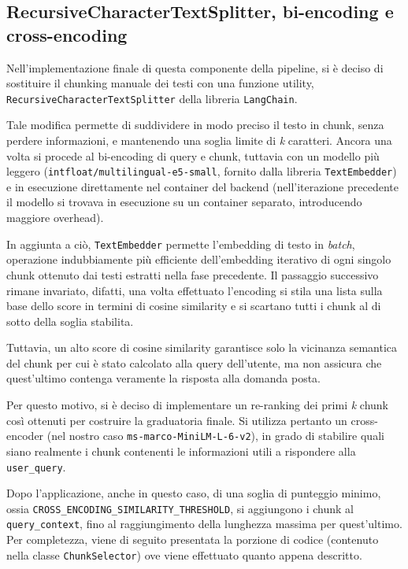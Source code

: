 \subsection{RecursiveCharacterTextSplitter, bi-encoding e cross-encoding}
Nell'implementazione finale di questa componente della pipeline, si è deciso di sostituire il chunking manuale dei testi con una funzione utility, \texttt{RecursiveCharacter\allowbreak TextSplitter} della libreria \texttt{LangChain}.

Tale modifica permette di suddividere in modo preciso il testo in chunk, senza perdere informazioni, e mantenendo una soglia limite di \textit{k} caratteri. Ancora una volta si procede al bi-encoding di query e chunk, tuttavia con un modello più leggero (\texttt{intfloat/multilingual-e5-small}, fornito dalla libreria \texttt{TextEmbedder}) e in esecuzione direttamente nel container del backend (nell'iterazione precedente il modello si trovava in esecuzione su un container separato, introducendo maggiore overhead).

In aggiunta a ciò, \texttt{TextEmbedder} permette l'embedding di testo in \textit{batch}, operazione indubbiamente più efficiente dell'embedding iterativo di ogni singolo chunk ottenuto dai testi estratti nella fase precedente. Il passaggio successivo rimane invariato, difatti, una volta effettuato l'encoding si stila una lista sulla base dello score in termini di cosine similarity e si scartano tutti i chunk al di sotto della soglia stabilita.

Tuttavia, un alto score di cosine similarity garantisce solo la vicinanza semantica del chunk per cui è stato calcolato alla query dell'utente, ma non assicura che quest'ultimo contenga veramente la risposta alla domanda posta.

Per questo motivo, si è deciso di implementare un re-ranking dei primi \textit{k} chunk così ottenuti per costruire la graduatoria finale. Si utilizza pertanto un cross-encoder (nel nostro caso \texttt{ms-marco-MiniLM-L-6-v2}), in grado di stabilire quali siano realmente i chunk contenenti le informazioni utili a rispondere alla \texttt{user\_query}.

Dopo l'applicazione, anche in questo caso, di una soglia di punteggio minimo, ossia \texttt{CROSS\_ENCODING\_SIMILARITY\_THRESHOLD},  si aggiungono i chunk al \texttt{query\_context}, fino al raggiungimento della lunghezza massima per quest'ultimo. Per completezza, viene di seguito presentata la porzione di codice (contenuto nella classe \texttt{ChunkSelector}) ove viene effettuato quanto appena descritto. \newpage

